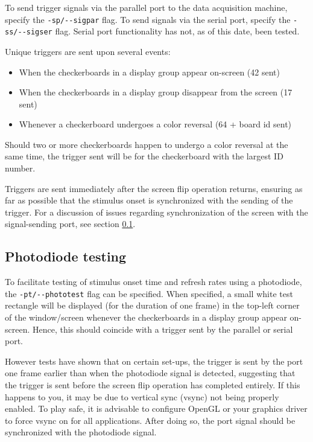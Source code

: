 \documentclass[12pt,titlepage]{article}
\newenvironment{compactemize}
{\begin{itemize}
  \setlength{\itemsep}{1.5pt}
  \setlength{\parskip}{0pt}
  \setlength{\parsep}{0pt}}
{\end{itemize}}
\begin{document}
To send trigger signals via the parallel port to the data acquisition
machine, specify the \lstinline{-sp/--sigpar} flag. To send signals
via the serial port, specify the \lstinline{-ss/--sigser} flag. Serial
port functionality has not, as of this date, been tested.

Unique triggers are sent upon several events:
\begin{compactemize}
\item When the checkerboards in a display group appear on-screen (42
  sent)
\item When the checkerboards in a display group disappear from the
  screen (17 sent)
\item Whenever a checkerboard undergoes a color reversal (64 + board
  id sent)
\end{compactemize}
Should two or more checkerboards happen to undergo a color reversal at
the same time, the trigger sent will be for the checkerboard
with the largest ID number.

Triggers are sent immediately after the screen flip operation returns,
ensuring as far as possible that the stimulus onset is synchronized
with the sending of the trigger. For a discussion of issues regarding
synchronization of the screen with the signal-sending port, see
section \ref{sec:phototest}.

\subsection{Photodiode testing}
\label{sec:phototest}

To facilitate testing of stimulus onset time and refresh rates using a
photodiode, the \lstinline{-pt/--phototest} flag can be
specified. When specified, a small white test rectangle will be
displayed (for the duration of one frame) in the top-left corner of the
window/screen whenever the checkerboards in a display group appear
on-screen. Hence, this should coincide with a trigger sent by the
parallel or serial port.

However tests have shown that on certain set-ups, the trigger is sent
by the port one frame earlier than when the photodiode signal is
detected, suggesting that the trigger is sent before the screen flip
operation has completed entirely. If this happens to you, it may be
due to vertical sync (vsync) not being properly enabled. To play safe,
it is advisable to configure OpenGL or your graphics driver to force
vsync on for all applications. After doing so, the port signal should
be synchronized with the photodiode signal.
\end{document}
